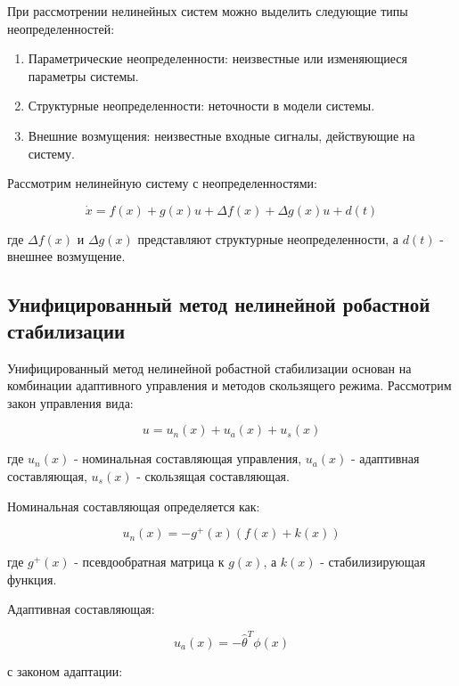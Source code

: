 \documentclass[a4paper,14pt]{extarticle} %
\begin{document}
При рассмотрении нелинейных систем можно выделить следующие типы неопределенностей:

\begin{enumerate}
    \item Параметрические неопределенности: неизвестные или изменяющиеся параметры системы.
    \item Структурные неопределенности: неточности в модели системы.
    \item Внешние возмущения: неизвестные входные сигналы, действующие на систему.
\end{enumerate}

Рассмотрим нелинейную систему с неопределенностями:

\begin{equation}
\dot{x} = f(x) + g(x)u + \Delta f(x) + \Delta g(x)u + d(t)
\end{equation}

где $\Delta f(x)$ и $\Delta g(x)$ представляют структурные неопределенности, а $d(t)$ - внешнее возмущение.

\subsection{Унифицированный метод нелинейной робастной стабилизации}

Унифицированный метод нелинейной робастной стабилизации основан на комбинации адаптивного управления и методов скользящего режима. Рассмотрим закон управления вида:

\begin{equation}
u = u_n(x) + u_a(x) + u_s(x)
\end{equation}

где $u_n(x)$ - номинальная составляющая управления, $u_a(x)$ - адаптивная составляющая, $u_s(x)$ - скользящая составляющая.

Номинальная составляющая определяется как:

\begin{equation}
u_n(x) = -g^+(x)(f(x) + k(x))
\end{equation}

где $g^+(x)$ - псевдообратная матрица к $g(x)$, а $k(x)$ - стабилизирующая функция.

Адаптивная составляющая:

\begin{equation}
u_a(x) = -\hat{\theta}^T\phi(x)
\end{equation}

с законом адаптации:
\end{document}
